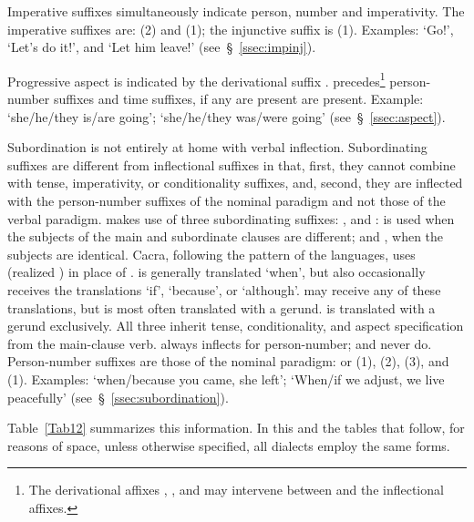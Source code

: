 Imperative suffixes simultaneously indicate person, number and imperativity. The imperative suffixes are:  (2) and  (1); the injunctive suffix is  (1). Examples:  ‘Go!’,  ‘Let’s do it!’, and  ‘Let him leave!’ (see~§~\ref{ssec:impinj}).

Progressive aspect is indicated by the derivational suffix .  precedes\footnote{The derivational affixes , , and  may intervene between  and the inflectional affixes.} person-number suffixes and time suffixes, if any are present are present. Example:  ‘she/he/they is/are going’;  ‘she/he/they was/were going’ (see~§~\ref{ssec:aspect}).

Subordination is not entirely at home with verbal inflection. Subordinating suffixes are different from inflectional suffixes in that, first, they cannot combine with tense, imperativity, or conditionality suffixes, and, second, they are inflected with the person-number suffixes of the nominal paradigm and not those of the verbal paradigm. \SYQ{} makes use of three subordinating suffixes: ,  and :  is used when the subjects of the main and subordinate clauses are different;  and , when the subjects are identical. Cacra, following the pattern of the \QI{} languages, uses  (realized \textipa{[l]}) in place of .  is generally translated ‘when’, but also occasionally receives the translations ‘if’, ‘because’, or ‘although’.  may receive any of these translations, but is most often translated with a gerund.  is translated with a gerund exclusively. All three inherit tense, conditionality, and aspect specification from the main-clause verb.  always inflects for person-number;  and  never do. Person-number suffixes are those of the nominal paradigm:  or \phono{-:} (1),  (2),  (3), and  (1). Examples:  ‘when/because you came, she left’;  ‘When/if we adjust, we live peacefully’ (see~§~\ref{ssec:subordination}).

Table~\ref{Tab12} summarizes this information. In this and the tables that follow, for reasons of space, unless otherwise specified, all dialects employ the same forms.


